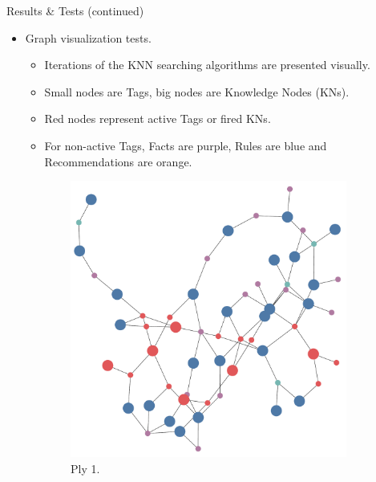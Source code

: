 \documentclass[final]{beamer} %
\begin{document}
\begin{frame}
\begin{columns}
\begin{column}{.35\textwidth}
{\begin{block}{Results \& Tests (continued)}
					\begin{itemize}
						\item Graph visualization tests.
						\begin{itemize}
							\item Iterations of the KNN searching algorithms are presented visually.
							\item Small nodes are Tags, big nodes are Knowledge Nodes (KNs).
							\item Red nodes represent active Tags or fired KNs. 
							\item For non-active Tags, Facts are purple, Rules are blue and Recommendations are orange.
						\end{itemize}
					\end{itemize}
					
					\begin{figure}[!htb]
						\centering
						\begin{subfigure}[!htb]{0.24\columnwidth}
							\centering
							\includegraphics[width=\columnwidth]{figures/knn_forward_think_1.pdf}
							\caption{Ply 1.}
						\end{subfigure}
						\begin{subfigure}[!htb]{0.24\columnwidth}
							\centering

\end{subfigure}
\end{figure}
\end{block}}
\end{column}
\end{columns}
\end{frame}
\end{document}
